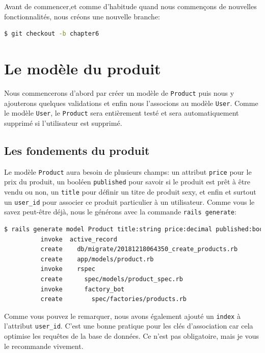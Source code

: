 \documentclass[]{report}
\begin{document}
  Avant de commencer,et comme d'habitude quand nous commençons de nouvelles fonctionnalités, nous créons une nouvelle branche:

  \begin{scriptsize}
    \begin{lstlisting}[language=bash]
    $ git checkout -b chapter6
    \end{lstlisting}
  \end{scriptsize}

  \section{Le modèle du produit}

    Nous commencerons d'abord par créer un modèle de \verb|Product| puis nous y ajouterons quelques validations et enfin nous l'associons au modèle \verb|User|. Comme le modèle \verb|User|, le \verb|Product| sera entièrement testé et sera automatiquement supprimé si l'utilisateur est supprimé.

    \subsection{Les fondements du produit}

      Le modèle \verb|Product| aura besoin de plusieurs champs: un attribut \verb|price| pour le prix du produit, un booléen \verb|published| pour savoir si le produit est prêt à être vendu ou non, un \verb|title| pour définir un titre de produit sexy, et enfin et surtout un \verb|user_id| pour associer ce produit particulier à un utilisateur. Comme vous le savez peut-être déjà, nous le générons avec la commande \verb|rails generate|:

      \begin{scriptsize}
        \begin{lstlisting}[language=bash]
        $ rails generate model Product title:string price:decimal published:boolean user_id:integer:index
          invoke  active_record
          create    db/migrate/20181218064350_create_products.rb
          create    app/models/product.rb
          invoke    rspec
          create      spec/models/product_spec.rb
          invoke      factory_bot
          create        spec/factories/products.rb
        \end{lstlisting}
      \end{scriptsize}

      Comme vous pouvez le remarquer, nous avons également ajouté un \verb|index| à l'attribut \verb|user_id|. C'est une bonne pratique pour les clés d'association car cela optimise les requêtes de la base de données. Ce n'est pas obligatoire, mais je vous le recommande vivement.
\end{document}
